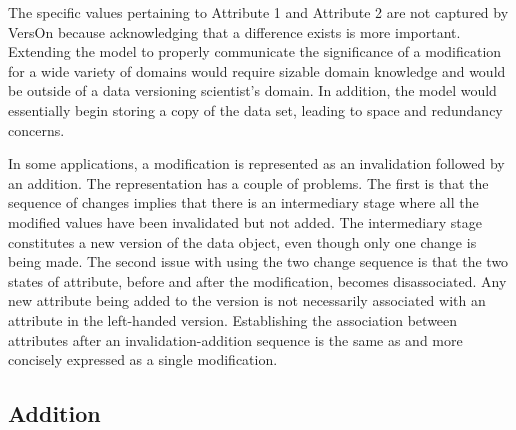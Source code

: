 The specific values pertaining to Attribute 1 and Attribute 2 are not captured by VersOn because acknowledging that a difference exists is more important.
Extending the model to properly communicate the significance of a modification for a wide variety of domains would require sizable domain knowledge and would be outside of a data versioning scientist's domain.
In addition, the model would essentially begin storing a copy of the data set, leading to space and redundancy concerns.

In some applications, a modification is represented as an invalidation followed by an addition.
The representation has a couple of problems.
The first is that the sequence of changes implies that there is an intermediary stage where all the modified values have been invalidated but not added.
The intermediary stage constitutes a new version of the data object, even though only one change is being made.
The second issue with using the two change sequence is that the two states of attribute, before and after the modification, becomes disassociated.
Any new attribute being added to the version is not necessarily associated with an attribute in the left-handed version.
Establishing the association between attributes after an invalidation-addition sequence is the same as and more concisely expressed as a single modification.

\subsection{Addition}

